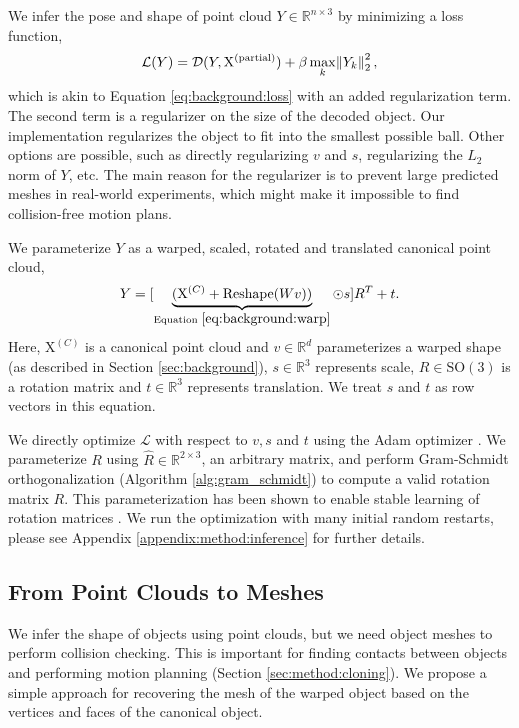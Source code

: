 \documentclass{article}
\newcommand{\pcx}[1]{\mathrm{X}^{(#1)}}
\newcommand{\pcc}{\pcx{C}}
\begin{document}
We infer the pose and shape of point cloud $Y \in \mathbb{R}^{n \times 3}$ by minimizing a loss function,
\begin{align}
    \mathcal{L}(Y) = \mathcal{D}(Y, \pcx{\mathrm{partial}}) + \beta \max_k \norm{Y_k}_2^2,
\end{align}
which is akin to Equation \ref{eq:background:loss} with an added regularization term.  The second term is a regularizer on the size of the decoded object. Our implementation regularizes the object to fit into the smallest possible ball. Other options are possible, such as directly regularizing $v$ and $s$, regularizing the $L_2$ norm of $Y$, etc. The main reason for the regularizer is to prevent large predicted meshes in real-world experiments, which might make it impossible to find collision-free motion plans.

We parameterize $Y$ as a warped, scaled, rotated and translated canonical point cloud,
\begin{align}
    Y = [\underbrace{(\pcc + \mathrm{Reshape}(W v))}_{\text{Equation } \ref{eq:background:warp}} \odot s] R^T + t.
    \label{eq:method:warp}
\end{align}
Here, $\pcc$ is a canonical point cloud and $v \in \mathbb{R}^d$ parameterizes a warped shape (as described in Section \ref{sec:background}), $s \in \mathbb{R}^3$ represents scale, $R \in \mathrm{SO}(3)$ is a rotation matrix and $t \in \mathbb{R}^3$ represents translation. We treat $s$ and $t$ as row vectors in this equation.

We directly optimize $\mathcal{L}$ with respect to $v, s$ and $t$ using the Adam optimizer \cite{kingma17adam}. We parameterize $R$ using $\hat{R} \in \mathbb{R}^{2 \times 3}$, an arbitrary matrix, and perform Gram-Schmidt orthogonalization (Algorithm \ref{alg:gram_schmidt}) to compute a valid rotation matrix $R$. This parameterization has been shown to enable stable learning of rotation matrices \cite{falorsi18explorations, park22learning}. We run the optimization with many initial random restarts, please see Appendix \ref{appendix:method:inference} for further details.

\subsection{From Point Clouds to Meshes}
\label{sec:methods:mesh}

We infer the shape of objects using point clouds, but we need object meshes to perform collision checking. This is important for finding contacts between objects and performing motion planning (Section \ref{sec:method:cloning}). We propose a simple approach for recovering the mesh of the warped object based on the vertices and faces of the canonical object.
\end{document}
